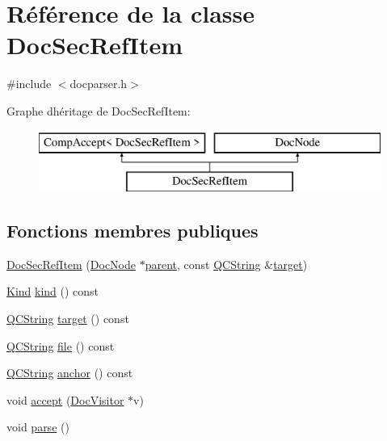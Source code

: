 \hypertarget{class_doc_sec_ref_item}{}\section{Référence de la classe Doc\+Sec\+Ref\+Item}
\label{class_doc_sec_ref_item}


{\ttfamily \#include $<$docparser.\+h$>$}

Graphe d\textquotesingle{}héritage de Doc\+Sec\+Ref\+Item\+:\begin{figure}[H]
\begin{center}
\leavevmode
\includegraphics[height=2.000000cm]{class_doc_sec_ref_item}
\end{center}
\end{figure}
\subsection*{Fonctions membres publiques}
\begin{DoxyCompactItemize}
\item 
\hyperlink{class_doc_sec_ref_item_a7c6861a721b3168cebab8059e571c475}{Doc\+Sec\+Ref\+Item} (\hyperlink{class_doc_node}{Doc\+Node} $\ast$\hyperlink{class_doc_node_a990d8b983962776a647e6231d38bd329}{parent}, const \hyperlink{class_q_c_string}{Q\+C\+String} \&\hyperlink{class_doc_sec_ref_item_a7d494ce80677432b2b49ef4d21baa266}{target})
\item 
\hyperlink{class_doc_node_aebd16e89ca590d84cbd40543ea5faadb}{Kind} \hyperlink{class_doc_sec_ref_item_a7461641d829cd19f9a9d73c1cbd4faaa}{kind} () const 
\item 
\hyperlink{class_q_c_string}{Q\+C\+String} \hyperlink{class_doc_sec_ref_item_a7d494ce80677432b2b49ef4d21baa266}{target} () const 
\item 
\hyperlink{class_q_c_string}{Q\+C\+String} \hyperlink{class_doc_sec_ref_item_aed2cf8a5533caf958c31fc63b2ec5b6c}{file} () const 
\item 
\hyperlink{class_q_c_string}{Q\+C\+String} \hyperlink{class_doc_sec_ref_item_a5ef5cce2b6f8def35e1f3694cd84c5c4}{anchor} () const 
\item 
void \hyperlink{class_doc_sec_ref_item_a3dda5f27166b11c6a054e6f95d11d9a7}{accept} (\hyperlink{class_doc_visitor}{Doc\+Visitor} $\ast$v)
\item 
void \hyperlink{class_doc_sec_ref_item_a35c9d6d150e7faaa88ea9ddfbeadb777}{parse} ()
\end{DoxyCompactItemize}
